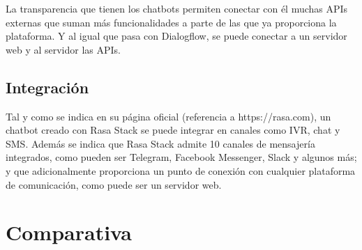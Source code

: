 La transparencia que tienen los chatbots permiten conectar con él muchas APIs externas que suman más funcionalidades a parte de las que ya proporciona la plataforma. Y al igual que pasa con Dialogflow, se puede conectar a un servidor web y al servidor las APIs.

\subsection*{Integración}

Tal y como se indica en su página oficial (referencia a https://rasa.com), un chatbot creado con Rasa Stack se puede integrar en canales como IVR, chat y SMS. Además se indica que Rasa Stack admite 10 canales de mensajería integrados, como pueden ser Telegram, Facebook Messenger, Slack y algunos más; y que adicionalmente proporciona un punto de conexión con cualquier plataforma de comunicación, como puede ser un servidor web.


\section{Comparativa}


\begin{table}[h]
\centering
{}
\caption{Comparativa de las plataformas de desarrollo}
\label{tab:my-table}
\end{table}
